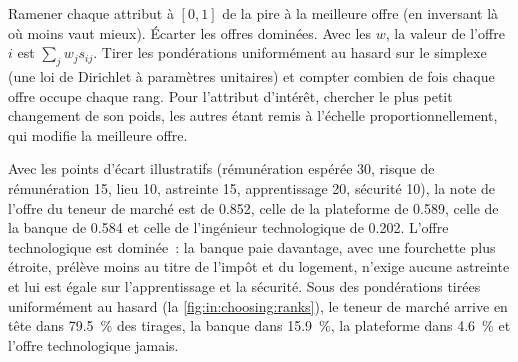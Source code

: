 \begin{method}\label{met:in:choosing:method}
Ramener chaque attribut à $[0,1]$ de la pire à la meilleure offre (en inversant là où moins vaut mieux). Écarter les offres dominées.
Avec les  $w$, la valeur de l'offre $i$ est $\sum_j w_j s_{ij}$. Tirer les pondérations uniformément au hasard sur le simplexe (une
loi de Dirichlet à paramètres unitaires) et compter combien de fois chaque offre occupe chaque rang. Pour
l'attribut d'intérêt, chercher le plus petit changement de son poids, les autres étant remis à l'échelle proportionnellement, qui modifie la meilleure offre.
\end{method}

Avec les points d'écart illustratifs (rémunération espérée 30, risque de rémunération 15, lieu 10, astreinte 15, apprentissage 20, sécurité 10), la
note de l'offre du teneur de marché est de 0.852, celle de la plateforme de 0.589, celle de la banque de 0.584 et celle de l'ingénieur technologique de 0.202.
L'offre technologique est dominée~: la banque paie davantage, avec une fourchette plus étroite, prélève moins au titre de l'impôt et du logement, n'exige
aucune astreinte et lui est égale sur l'apprentissage et la sécurité. Sous des pondérations tirées uniformément au hasard (la \cref{fig:in:choosing:ranks}), le
teneur de marché arrive en tête dans 79.5~\% des tirages, la banque dans 15.9~\%, la plateforme dans 4.6~\% et l'offre technologique jamais.

\begin{omfigure}

\label{fig:in:choosing:ranks}
\end{omfigure}


